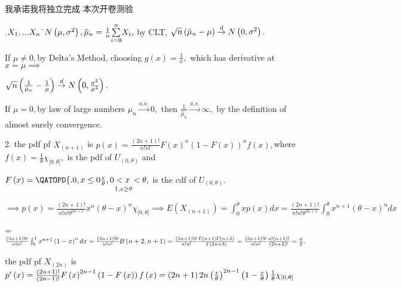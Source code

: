 \documentclass{ctexart}
\begin{document}
我承诺我将独立完成%
本次开卷测验

.$X_{1},...X_{n}\symbol{126}N\left( \mu ,\sigma ^{2}\right) ,\hat{%
\mu}_{n}=\frac{1}{n}\underset{i=0}{\overset{n}{\sum }}X_{i},$ by CLT, $\sqrt{%
n}\left( \hat{\mu}_{n}-\mu \right) \overset{d}{\rightarrow }N\left( 0,\sigma
^{2}\right) .$

If $\mu \neq 0,$by Delta's Method, choosing $g\left( x\right) =\frac{1}{x},$%
which has derivative at $x=\mu \implies $

$\sqrt{n}\left( \frac{1}{\hat{\mu}_{n}}-\frac{1}{\mu }\right) \overset{d}{%
\rightarrow }N\left( 0,\frac{\sigma ^{2}}{\mu ^{4}}\right) .$

If $\mu =0,$by law of large numbers $\hat{\mu}_{n}\overset{a.s.}{\rightarrow 
}0,$ then $\frac{1}{\hat{\mu}_{n}}\overset{a.s.}{\rightarrow }\infty ,$ by
the definition of almost surely convergence.

2. the pdf pf $X_{\left( n+1\right) }$ is $p\left( x\right) =\frac{\left(
2n+1\right) !}{n!n!}F\left( x\right) ^{n}\left( 1-F\left( x\right) \right)
^{n}f\left( x\right) ,$where $f\left( x\right) =\frac{1}{\theta }\chi
_{\lbrack 0,\theta ]},$ is the pdf of $U_{\left( 0,\theta \right) }$ and

$F\left( x\right) =\QATOPD\{ . {0,x\leq 0}{\underset{1,x\geq \theta }{\frac{x%
}{\theta },0<x\,<\theta }},$ is the cdf of $U_{\left( 0,\theta \right) }.$

$\implies p\left( x\right) =\frac{\left( 2n+1\right) !}{n!n!\theta ^{2n+1}}%
x^{n}\left( \theta -x\right) ^{n}\chi _{\lbrack 0,\theta ]}\implies E\left(
X_{\left( n+1\right) }\right) =\int_{0}^{\theta }xp(x)dx=\frac{\left(
2n+1\right) !}{n!n!\theta ^{2n+1}}\int_{0}^{\theta }x^{n+1}\left( \theta
-x\right) ^{n}dx$

=$\frac{\left( 2n+1\right) !\theta }{n!n!}\int_{0}^{1}x^{n+1}\left(
1-x\right) ^{n}dx=\frac{\left( 2n+1\right) !\theta }{n!n!}B\left(
n+2,n+1\right) =\frac{\left( 2n+1\right) !\theta }{n!n!}\frac{\Gamma \left(
n+1\right) \Gamma \left( n+2\right) }{\Gamma \left( 2n+3\right) }=\frac{%
\left( 2n+1\right) !\theta }{n!n!}\frac{n!\left( n+1\right) !}{\left(
2n+2\right) !}=\frac{\theta }{2}.$

the pdf pf $X_{\left( 2n\right) }$ is $p^{\prime }\left( x\right) =\frac{%
\left( 2n+1\right) !}{\left( 2n-1\right) !}F\left( x\right) ^{2n-1}\left(
1-F\left( x\right) \right) f\left( x\right) =\left( 2n+1\right) 2n\left( 
\frac{x}{\theta }\right) ^{2n-1}\left( 1-\frac{x}{\theta }\right) \frac{1}{%
\theta }\chi _{\lbrack 0,\theta ]}$
\end{document}
